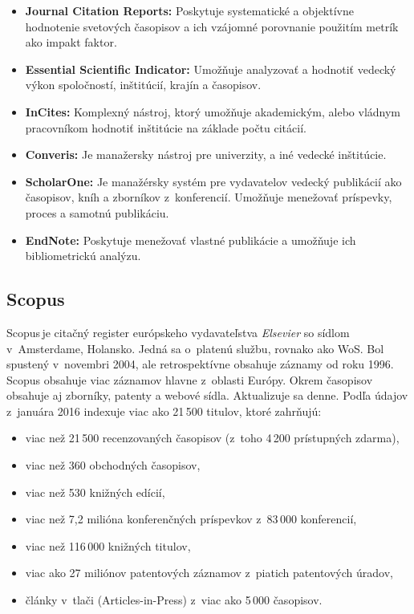 \begin{itemize}
\item \textbf{Journal Citation Reports:} Poskytuje systematické a objektívne
  hodnotenie svetových časopisov a ich vzájomné porovnanie použitím metrík ako
  impakt faktor.
\item \textbf{Essential Scientific Indicator:} Umožňuje analyzovať a hodnotiť
  vedecký výkon spoločností, inštitúcií, krajín a časopisov.
\item \textbf{InCites:} Komplexný nástroj, ktorý umožňuje akademickým,
  alebo vládnym pracovníkom hodnotiť inštitúcie na základe počtu citácií.
\item \textbf{Converis:} Je manažersky nástroj pre univerzity, a iné vedecké
  inštitúcie.
\item \textbf{ScholarOne:} Je manažérsky systém pre vydavatelov vedecký
  publikácií ako časopisov, kníh a zborníkov z~konferencií. Umožňuje
  menežovať príspevky,  proces a samotnú publikáciu.
\item \textbf{EndNote:} Poskytuje menežovať vlastné publikácie a umožňuje
  ich bibliometrickú analýzu.
\end{itemize}



\subsection{Scopus}
\label{sec:scopus}

Scopus\,\R je citačný register európskeho vydavateľstva \emph{Elsevier} so sídlom
v~Amsterdame, Holansko.  Jedná sa o~platenú službu, rovnako ako WoS.  Bol
spustený v~novembri 2004, ale retrospektívne obsahuje záznamy od roku 1996.
Scopus obsahuje viac záznamov hlavne z~oblasti Európy.  Okrem časopisov obsahuje
aj zborníky, patenty a webové sídla.  Aktualizuje sa denne.  Podľa údajov
z~januára 2016 indexuje viac ako 21\,500 titulov, ktoré zahrňujú:

\begin{itemize}
  \item viac než 21\,500 recenzovaných časopisov (z~toho 4\,200 prístupných
    zdarma),
  \item viac než 360 obchodných časopisov,
  \item viac než 530 knižných edícií,
  \item viac než 7,2 milióna konferenčných príspevkov z~83\,000 konferencií,
  \item viac než 116\,000 knižných titulov,
  \item viac ako 27 miliónov patentových záznamov z~piatich patentových úradov,
  \item články v~tlači (Articles-in-Press) z~viac ako 5\,000 časopisov.
\end{itemize}

